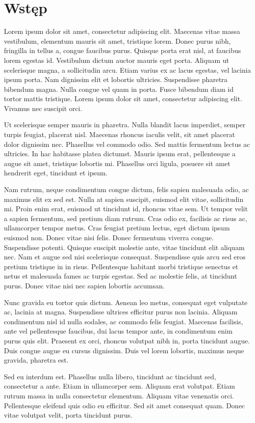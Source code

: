 \chapter{Wstęp}
\label{cha:wstep}

Lorem ipsum dolor sit amet, consectetur adipiscing elit. Maecenas vitae massa vestibulum, elementum mauris sit amet, tristique lorem. Donec purus nibh, fringilla in tellus a, congue faucibus purus. Quisque porta erat nisl, at faucibus lorem egestas id. Vestibulum dictum auctor mauris eget porta. Aliquam ut scelerisque magna, a sollicitudin arcu. Etiam varius ex ac lacus egestas, vel lacinia ipsum porta. Nam dignissim elit et lobortis ultricies. Suspendisse pharetra bibendum magna. Nulla congue vel quam in porta. Fusce bibendum diam id tortor mattis tristique. Lorem ipsum dolor sit amet, consectetur adipiscing elit. Vivamus nec suscipit orci.

Ut scelerisque semper mauris in pharetra. Nulla blandit lacus imperdiet, semper turpis feugiat, placerat nisl. Maecenas rhoncus iaculis velit, sit amet placerat dolor dignissim nec. Phasellus vel commodo odio. Sed mattis fermentum lectus ac ultricies. In hac habitasse platea dictumst. Mauris ipsum erat, pellentesque a augue sit amet, tristique lobortis mi. Phasellus orci ligula, posuere sit amet hendrerit eget, tincidunt et ipsum.

Nam rutrum, neque condimentum congue dictum, felis sapien malesuada odio, ac maximus elit ex sed est. Nulla at sapien suscipit, euismod elit vitae, sollicitudin mi. Proin enim erat, euismod ut tincidunt id, rhoncus vitae sem. Ut tempor velit a sapien fermentum, sed pretium diam rutrum. Cras odio ex, facilisis ac risus ac, ullamcorper tempor metus. Cras feugiat pretium lectus, eget dictum ipsum euismod non. Donec vitae nisi felis. Donec fermentum viverra congue. Suspendisse potenti. Quisque suscipit molestie ante, vitae tincidunt elit aliquam nec. Nam et augue sed nisi scelerisque consequat. Suspendisse quis arcu sed eros pretium tristique in in risus. Pellentesque habitant morbi tristique senectus et netus et malesuada fames ac turpis egestas. Sed ac molestie felis, at tincidunt purus. Donec vitae nisi nec sapien lobortis accumsan.

Nunc gravida eu tortor quis dictum. Aenean leo metus, consequat eget vulputate ac, lacinia at magna. Suspendisse ultrices efficitur purus non lacinia. Aliquam condimentum nisl id nulla sodales, ac commodo felis feugiat. Maecenas facilisis, ante vel pellentesque faucibus, dui lacus tempor ante, in condimentum enim purus quis elit. Praesent ex orci, rhoncus volutpat nibh in, porta tincidunt augue. Duis congue augue eu cursus dignissim. Duis vel lorem lobortis, maximus neque gravida, pharetra est.

Sed eu interdum est. Phasellus nulla libero, tincidunt ac tincidunt sed, consectetur a ante. Etiam in ullamcorper sem. Aliquam erat volutpat. Etiam rutrum massa in nulla consectetur elementum. Aliquam vitae venenatis orci. Pellentesque eleifend quis odio eu efficitur. Sed sit amet consequat quam. Donec vitae volutpat velit, porta tincidunt purus.\cite{giza2017}

